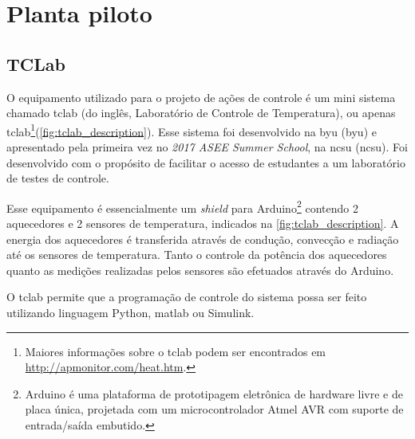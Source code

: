 
\chapter{Planta piloto}
\label{ch:planta_piloto}

\section{TCLab}
\label{sec:tclab}

O equipamento utilizado para o projeto de ações de controle é um mini sistema chamado \acrlong{tclab}
(do inglês, Laboratório de Controle de Temperatura), ou apenas \acrshort{tclab}\footnote{                       %
	Maiores informações sobre o \acrshort{tclab} podem ser encontrados em
	\href{http://apmonitor.com/heat.htm}{http://apmonitor.com/heat.htm}.
}(\cref{fig:tclab_description}). Esse sistema foi desenvolvido na \acrlong{byu} (\acrshort{byu}) e apresentado
pela primeira vez no \textit{2017 ASEE Summer School}, na \acrlong{ncsu} (\acrshort{ncsu}). Foi
desenvolvido com o propósito de facilitar o acesso de estudantes a um laboratório de testes de controle.

Esse equipamento é essencialmente um \textit{shield} para Arduino\footnote{
    Arduino é uma plataforma de prototipagem eletrônica de hardware livre e de placa única, projetada com um    %
    microcontrolador Atmel AVR com suporte de entrada/saída embutido.                                           %
} contendo 2 aquecedores e 2 sensores de temperatura, indicados na \cref{fig:tclab_description}. A energia dos aquecedores é
transferida através de condução, convecção e radiação até os sensores de temperatura. Tanto o controle da
potência dos aquecedores quanto as medições realizadas pelos sensores são efetuados através do Arduino.

O \acrshort{tclab} permite que a programação de controle do sistema possa ser feito utilizando linguagem Python,
\acrshort{matlab} ou Simulink.


